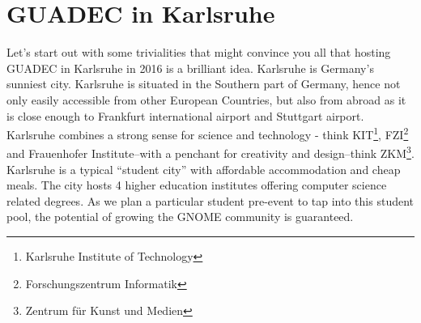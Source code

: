 
\section{GUADEC in Karlsruhe}

Let's start out with some trivialities that might convince you all that 
hosting GUADEC in Karlsruhe in 2016 is a brilliant idea. Karlsruhe is 
Germany's sunniest city. Karlsruhe is situated in the Southern part of 
Germany, hence not only easily accessible from other European 
Countries, but also from abroad as it is close enough to Frankfurt 
international airport and Stuttgart airport. Karlsruhe combines a 
strong sense for science and technology - think KIT\footnote{Karlsruhe 
Institute of Technology}, FZI\footnote{Forschungszentrum Informatik} 
and Frauenhofer Institute–with a penchant for creativity and 
design–think ZKM\footnote{Zentrum für Kunst und Medien}. Karlsruhe is a 
typical “student city” with affordable accommodation and cheap meals. 
The city hosts 4 higher education institutes offering computer science 
related degrees. As we plan a particular student pre-event to tap into 
this student pool, the potential of growing the GNOME community is 
guaranteed.


\vfill


